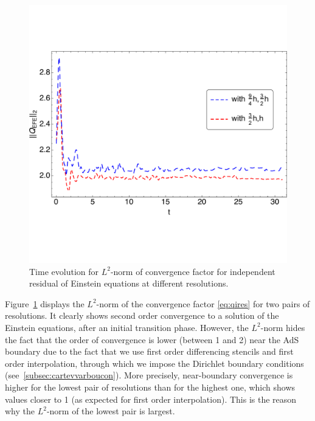 \documentclass[a4paper,11pt]{article}
\numberwithin{equation}{section}
\begin{document}
\begin{figure}[t!]
        \centering
        \includegraphics[width=5.0in,clip=true]{plots/timeseries/L2norm_iresallconvergence/fullplottL2normdim2boundedrescaledconvergenceiresallallres.pdf}
\parbox{5.0in}{\caption{Time evolution for $L^2$-norm of convergence factor for independent residual of Einstein equations at different resolutions.
        }\label{fig:L2norm_iresallconvergence-crop}}
\end{figure}

Figure~\ref{fig:L2norm_iresallconvergence-crop} displays the $L^2$-norm of the convergence factor \eqref{eq:qires} for two pairs of resolutions. It clearly shows second order convergence to a solution of the Einstein equations, after an initial transition phase. However, the $L^2$-norm hides the fact that the order of convergence is lower (between 1 and 2) near the AdS boundary due to the fact that we use first order differencing stencils and first order interpolation, through which we impose the Dirichlet boundary conditions (see~\ref{subsec:cartevvarboucon}). More precisely, near-boundary convergence is higher for the lowest pair of resolutions than for the highest one, which shows values closer to 1 (as expected for first order interpolation). This is the reason why the $L^2$-norm of the lowest pair is largest.





\end{document}
